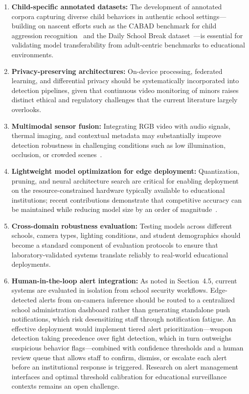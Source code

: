 \documentclass[conference]{IEEEtran}
\begin{document}
\begin{enumerate}
\item \textbf{Child-specific annotated datasets:} The development of annotated corpora capturing diverse child behaviors in authentic school settings---building on nascent efforts such as the CABAD benchmark for child aggression recognition~\cite{b15} and the Daily School Break dataset~\cite{b11}---is essential for validating model transferability from adult-centric benchmarks to educational environments.

\item \textbf{Privacy-preserving architectures:} On-device processing, federated learning, and differential privacy should be systematically incorporated into detection pipelines, given that continuous video monitoring of minors raises distinct ethical and regulatory challenges that the current literature largely overlooks.

\item \textbf{Multimodal sensor fusion:} Integrating RGB video with audio signals, thermal imaging, and contextual metadata may substantially improve detection robustness in challenging conditions such as low illumination, occlusion, or crowded scenes~\cite{b21,b22}.

\item \textbf{Lightweight model optimization for edge deployment:} Quantization, pruning, and neural architecture search are critical for enabling deployment on the resource-constrained hardware typically available to educational institutions; recent contributions demonstrate that competitive accuracy can be maintained while reducing model size by an order of magnitude~\cite{b7,b23}.

\item \textbf{Cross-domain robustness evaluation:} Testing models across different schools, camera types, lighting conditions, and student demographics should become a standard component of evaluation protocols to ensure that laboratory-validated systems translate reliably to real-world educational deployments.

\item \textbf{Human-in-the-loop alert integration:} As noted in Section~4.5, current systems are evaluated in isolation from school security workflows. Edge-detected alerts from on-camera inference should be routed to a centralized school administration dashboard rather than generating standalone push notifications, which risk desensitizing staff through notification fatigue. An effective deployment would implement tiered alert prioritization---weapon detection taking precedence over fight detection, which in turn outweighs suspicious behavior flags---combined with confidence thresholds and a human review queue that allows staff to confirm, dismiss, or escalate each alert before an institutional response is triggered. Research on alert management interfaces and optimal threshold calibration for educational surveillance contexts remains an open challenge.
\end{enumerate}
\end{document}
